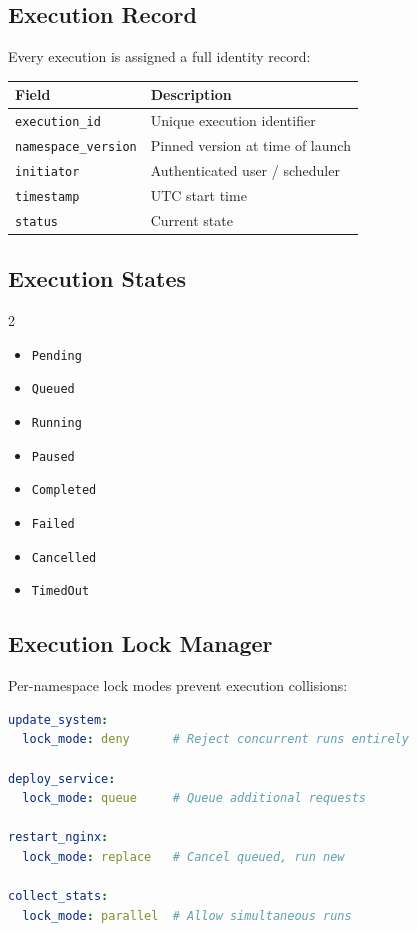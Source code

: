 \documentclass[12pt,a4paper]{article}
\begin{document}
\subsection{Execution Record}

Every execution is assigned a full identity record:

\begin{center}
\begin{tabular}{ll}
\toprule
Field & Description \\
\midrule
\texttt{execution\_id} & Unique execution identifier \\
\texttt{namespace\_version} & Pinned version at time of launch \\
\texttt{initiator} & Authenticated user / scheduler \\
\texttt{timestamp} & UTC start time \\
\texttt{status} & Current state \\
\bottomrule
\end{tabular}
\end{center}

\subsection{Execution States}

\begin{multicols}{2}
\begin{itemize}[noitemsep,leftmargin=*]
    \item \texttt{Pending}
    \item \texttt{Queued}
    \item \texttt{Running}
    \item \texttt{Paused}
    \item \texttt{Completed}
    \item \texttt{Failed}
    \item \texttt{Cancelled}
    \item \texttt{TimedOut}
\end{itemize}
\end{multicols}

\subsection{Execution Lock Manager}

Per-namespace lock modes prevent execution collisions:

\begin{lstlisting}[language=yaml, caption={Lock mode configuration}]
update_system:
  lock_mode: deny      # Reject concurrent runs entirely

deploy_service:
  lock_mode: queue     # Queue additional requests

restart_nginx:
  lock_mode: replace   # Cancel queued, run new

collect_stats:
  lock_mode: parallel  # Allow simultaneous runs
\end{lstlisting}
\end{document}
